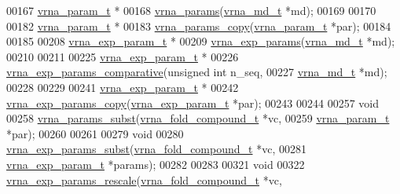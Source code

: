 \begin{DoxyCode}
00167 \mbox{\hyperlink{group__energy__parameters_structvrna__param__s}{vrna\_param\_t}} *
00168 \mbox{\hyperlink{group__energy__parameters_gad0e3e7e74bdc50d1709d40c92993185e}{vrna\_params}}(\mbox{\hyperlink{group__model__details_structvrna__md__s}{vrna\_md\_t}} *md);
00169 
00170 
00182 \mbox{\hyperlink{group__energy__parameters_structvrna__param__s}{vrna\_param\_t}} *
00183 \mbox{\hyperlink{group__energy__parameters_ga4bffa39f26e7746148444dd8a8426eca}{vrna\_params\_copy}}(\mbox{\hyperlink{group__energy__parameters_structvrna__param__s}{vrna\_param\_t}} *par);
00184 
00185 
00208 \mbox{\hyperlink{group__energy__parameters_structvrna__exp__param__s}{vrna\_exp\_param\_t}} *
00209 \mbox{\hyperlink{group__energy__parameters_gab1f3016f96aa96bff020cdd904605afa}{vrna\_exp\_params}}(\mbox{\hyperlink{group__model__details_structvrna__md__s}{vrna\_md\_t}} *md);
00210 
00211 
00225 \mbox{\hyperlink{group__energy__parameters_structvrna__exp__param__s}{vrna\_exp\_param\_t}} *
00226 \mbox{\hyperlink{group__energy__parameters_gaf78c09e685e6eef4100b1a41d4042550}{vrna\_exp\_params\_comparative}}(\textcolor{keywordtype}{unsigned} \textcolor{keywordtype}{int}  n\_seq,
00227                             \mbox{\hyperlink{group__model__details_structvrna__md__s}{vrna\_md\_t}}     *md);
00228 
00229 
00241 \mbox{\hyperlink{group__energy__parameters_structvrna__exp__param__s}{vrna\_exp\_param\_t}} *
00242 \mbox{\hyperlink{group__energy__parameters_ga70bc46be7cfa5434a71efe241c4f0609}{vrna\_exp\_params\_copy}}(\mbox{\hyperlink{group__energy__parameters_structvrna__exp__param__s}{vrna\_exp\_param\_t}} *par);
00243 
00244 
00257 \textcolor{keywordtype}{void}
00258 \mbox{\hyperlink{group__energy__parameters_ga5d1909208f7ea3baa98b75afaa1f62ca}{vrna\_params\_subst}}(\mbox{\hyperlink{group__fold__compound_structvrna__fc__s}{vrna\_fold\_compound\_t}}  *vc,
00259                   \mbox{\hyperlink{group__energy__parameters_structvrna__param__s}{vrna\_param\_t}}          *par);
00260 
00261 
00279 \textcolor{keywordtype}{void}
00280 \mbox{\hyperlink{group__energy__parameters_ga8e7ac4fab3b0cc03afbc134eaafb3525}{vrna\_exp\_params\_subst}}(\mbox{\hyperlink{group__fold__compound_structvrna__fc__s}{vrna\_fold\_compound\_t}}  *vc,
00281                       \mbox{\hyperlink{group__energy__parameters_structvrna__exp__param__s}{vrna\_exp\_param\_t}}      *params);
00282 
00283 
00321 \textcolor{keywordtype}{void}
00322 \mbox{\hyperlink{group__energy__parameters_gad607bc3a5b5da16400e2ca4ea5560233}{vrna\_exp\_params\_rescale}}(\mbox{\hyperlink{group__fold__compound_structvrna__fc__s}{vrna\_fold\_compound\_t}}  *vc,

\end{DoxyCode}
